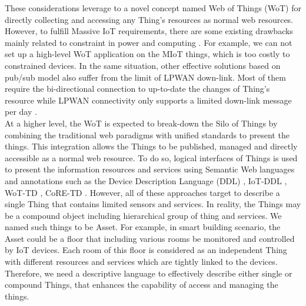 These considerations leverage to a novel concept named Web of Things (WoT) for directly collecting and accessing any Thing's resources as normal web resources. However, to fulfill Massive IoT requirements, there are some existing drawbacks mainly related to constraint in power and computing \cite{northstream_iot}. For example, we can not set up a high-level WoT application on the MIoT things, which is too costly to constrained devices. In the same situation, other effective solutions based on pub/sub model also suffer from the limit of LPWAN down-link. Most of them require the bi-directional connection to up-to-date the changes of Thing's resource while LPWAN connectivity only supports a limited down-link message per day \cite{sinha2017survey}. \\

At a higher level, the WoT is expected to break-down the Silo of Things by combining the traditional web paradigms with unified standards to present the things. This integration allows the Things to be published, managed and directly accessible as a normal web resource. To do so, logical interfaces of Things is used to present the information resources and services using Semantic Web languages and annotations such as the Device Description Language (DDL) \cite{chen2009device}, IoT-DDL \cite{khaled2018iot}, WoT-TD \cite{wc3_wot}, CoRE-TD \cite{7520965}. However, all of these approaches target to describe a single Thing that contains limited sensors and services. In reality, the Things may be a compound object including hierarchical group of thing and services. We named such things to be Asset. For example, in smart building scenario, the Asset could be a floor that including various rooms be monitored and controlled by IoT devices. Each room of this floor is considered as an independent Thing with different resources and services which are tightly linked to the devices. Therefore, we need a descriptive language to effectively describe either single or compound Things, that enhances the capability of access and managing the things. \\

